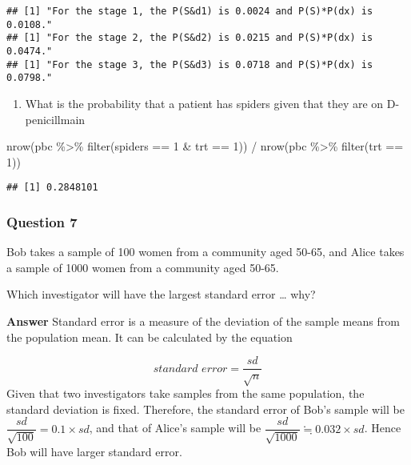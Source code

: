 \documentclass[
]{article}
\newenvironment{Shaded}{\begin{snugshade}}{\end{snugshade}}
\newcommand{\DecValTok}[1]{\textcolor[rgb]{0.00,0.00,0.81}{#1}}
\newcommand{\FunctionTok}[1]{\textcolor[rgb]{0.00,0.00,0.00}{#1}}
\newcommand{\NormalTok}[1]{#1}
\newcommand{\SpecialCharTok}[1]{\textcolor[rgb]{0.00,0.00,0.00}{#1}}
\providecommand{\tightlist}{%
  \setlength{\itemsep}{0pt}\setlength{\parskip}{0pt}}
\begin{document}
\begin{verbatim}
## [1] "For the stage 1, the P(S&d1) is 0.0024 and P(S)*P(dx) is 0.0108."
## [1] "For the stage 2, the P(S&d2) is 0.0215 and P(S)*P(dx) is 0.0474."
## [1] "For the stage 3, the P(S&d3) is 0.0718 and P(S)*P(dx) is 0.0798."
\end{verbatim}

\begin{enumerate}
\def\labelenumi{\alph{enumi})}
\setcounter{enumi}{10}
\tightlist
\item
  What is the probability that a patient has spiders given that they are
  on D-penicillmain
\end{enumerate}

\begin{Shaded}
\begin{Highlighting}[]
\FunctionTok{nrow}\NormalTok{(pbc }\SpecialCharTok{\%\textgreater{}\%}
       \FunctionTok{filter}\NormalTok{(spiders }\SpecialCharTok{==} \DecValTok{1} \SpecialCharTok{\&}
\NormalTok{                trt }\SpecialCharTok{==} \DecValTok{1}\NormalTok{)) }\SpecialCharTok{/} 
  \FunctionTok{nrow}\NormalTok{(pbc }\SpecialCharTok{\%\textgreater{}\%}
         \FunctionTok{filter}\NormalTok{(trt }\SpecialCharTok{==} \DecValTok{1}\NormalTok{))}
\end{Highlighting}
\end{Shaded}

\begin{verbatim}
## [1] 0.2848101
\end{verbatim}

\hypertarget{question-7}{%
\subsubsection{Question 7}\label{question-7}}

Bob takes a sample of 100 women from a community aged 50-65, and Alice
takes a sample of 1000 women from a community aged 50-65.

Which investigator will have the largest standard error \ldots{} why?

\textbf{Answer} Standard error is a measure of the deviation of the
sample means from the population mean. It can be calculated by the
equation

\[
\textit{standard error} = \frac{sd}{\sqrt{n}}
\] Given that two investigators take samples from the same population,
the standard deviation is fixed. Therefore, the standard error of Bob's
sample will be \(\dfrac{sd}{\sqrt{100}} = 0.1 \times sd\), and that of
Alice's sample will be
\(\dfrac{sd}{\sqrt{1000}}\fallingdotseq 0.032 \times sd\). Hence Bob
will have larger standard error.
\end{document}
